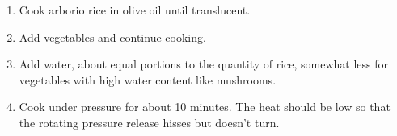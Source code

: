 
\begin{ingredients}
\end{ingredients}


\begin{recipe}
  \begin{enumerate}

  \item Cook arborio rice in olive oil until translucent.

  \item Add vegetables and continue cooking.

  \item Add water, about equal portions to the quantity of rice,
    somewhat less for vegetables with high water content like
    mushrooms.

  \item Cook under pressure for about 10 minutes.  The heat should be
    low so that the rotating pressure release hisses but doesn't turn.

  \end{enumerate}
\end{recipe}
